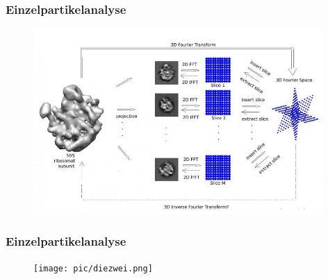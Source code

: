 \begin{frame}
	\frametitle{Einzelpartikelanalyse}
	\begin{figure}
		\includegraphics[width = 11cm]{pic/radon.jpg}
		\hspace{3cm}
	\end{figure}
	\vspace{3cm}
\end{frame}

\begin{frame}
	\frametitle{Einzelpartikelanalyse}
	\begin{figure}
		\texttt{[image: pic/diezwei.png]}
	\end{figure}
\end{frame}